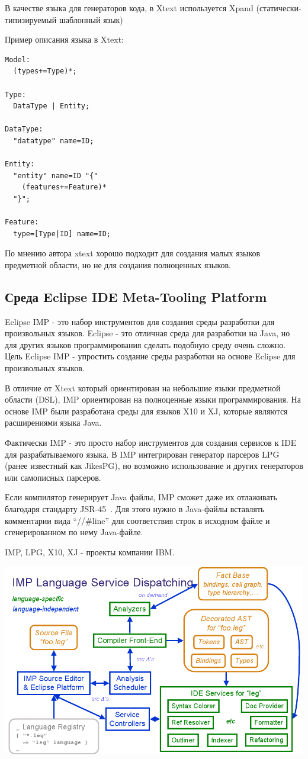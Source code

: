 \documentclass[a4paper,12pt]{article}
\begin{document}
В качестве языка для генераторов кода, в Xtext используется Xpand
(статически-типизируемый шаблонный язык)

\begin{example}
Пример описания языка в Xtext:
\end{example}
\begin{verbatim}
Model:
  (types+=Type)*;

Type:
  DataType | Entity;

DataType:
  "datatype" name=ID;

Entity:
  "entity" name=ID "{"
    (features+=Feature)* 
  "}";

Feature:
  type=[Type|ID] name=ID;   
\end{verbatim}

По мнению автора xtext хорошо подходит для создания малых языков предметной
области, но не для создания полноценных языков. 

\subsection{Среда Eclipse IDE Meta-Tooling Platform}
Eclipse IMP - это набор инструментов для создания среды разработки для
произвольных языков.
Eclipse - это отличная среда для разработки на Java, но для
других языков программирования сделать подобную среду очень сложно. Цель
Eclipse IMP - упростить создание среды разработки на основе Eclipse для
произвольных языков.

В отличие от Xtext который ориентирован на небольшие языки предметной области
(DSL), IMP ориентирован на полноценные языки программирования. На основе IMP
были разработана среды для языков X10 и XJ, которые являются расширениями
языка Java.

Фактически IMP - это просто набор инструментов для создания сервисов к IDE для
разрабатываемого языка. В IMP интегрирован генератор парсеров LPG (ранее
известный как JikesPG), но возможно использование и других генераторов или
самописных парсеров.

Если компилятор генерирует Java файлы, IMP сможет даже их отлаживать благодаря
стандарту JSR-45~\cite{JSR45}. Для этого нужно в Java-файлы вставлять
комментарии вида ``//\#line'' для соответствия строк в исходном файле и сгенерированном по нему Java-файле.

IMP, LPG, X10, XJ - проекты компании IBM.

\includegraphics[scale=0.4]{img/imp.png}
\end{document}
